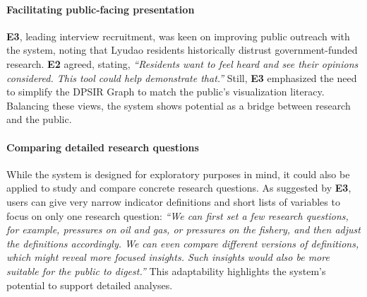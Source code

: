 \vspace*{-0.15cm}
\paragraph{Facilitating public-facing presentation}
\textbf{E3}, leading interview recruitment, was keen on improving public outreach with the system, noting that Lyudao residents historically distrust government-funded research. \textbf{E2} agreed, stating, \textit{``Residents want to feel heard and see their opinions considered. This tool could help demonstrate that.''} Still, \textbf{E3} emphasized the need to simplify the DPSIR Graph to match the public's visualization literacy. Balancing these views, the system shows potential as a bridge between research and the public.

\vspace*{-0.15cm}
\paragraph{Comparing detailed research questions}
While the system is designed for exploratory purposes in mind, it could also be applied to study and compare concrete research questions. As suggested by \textbf{E3}, users can give very narrow indicator definitions and short lists of variables to focus on only one research question: \textit{``We can first set a few research questions, for example, pressures on oil and gas, or pressures on the fishery, and then adjust the definitions accordingly. We can even compare different versions of definitions, which might reveal more focused insights. Such insights would also be more suitable for the public to digest.''}
This adaptability highlights the system's potential to support detailed analyses.